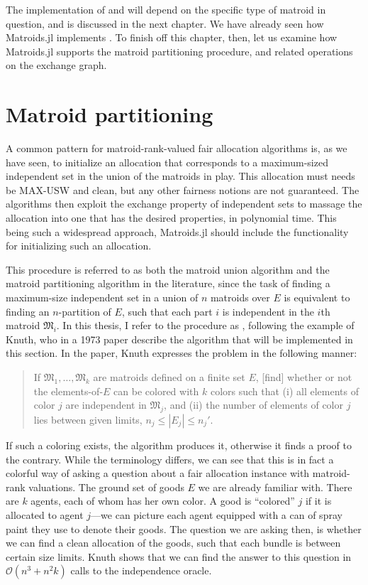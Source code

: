 The implementation of  and  will depend on the specific type of matroid in question, and is discussed in the next chapter. We have already seen how Matroids.jl implements . To finish off this chapter, then, let us examine how Matroids.jl supports the matroid partitioning procedure, and related operations on the exchange graph.

\section{Matroid partitioning}
\label{sec:matroid-union-impl}
A common pattern for matroid-rank-valued fair allocation algorithms is, as we have seen, to initialize an allocation that corresponds to a maximum-sized independent set in the union of the matroids in play. This allocation must needs be MAX-USW and clean, but any other fairness notions are not guaranteed. The algorithms then exploit the exchange property of independent sets to massage the allocation into one that has the desired properties, in polynomial time. This being such a widespread approach, Matroids.jl should include the functionality for initializing such an allocation. 

This procedure is referred to as both the matroid union algorithm and the matroid partitioning algorithm in the literature, since the task of finding a maximum-size independent set in a union of $n$ matroids over $E$ is equivalent to finding an $n$-partition of $E$, such that each part $i$ is independent in the $i$th matroid $\mathfrak{M}_i$. In this thesis, I refer to the procedure as , following the example of Knuth, who in a 1973 paper describe the algorithm that will be implemented in this section. In the paper, Knuth expresses the problem in the following manner: 
\begin{quote}
  If $\mathfrak{M}_1,\dots,\mathfrak{M}_k$ are matroids defined on a finite set $E$, [find] whether or not the elements-of-$E$ can be colored with $k$ colors such that (i) all elements of color $j$ are independent in $\mathfrak{M}_j$, and (ii) the number of elements of color $j$ lies between given limits, $n_j\leq |E_j| \leq n_j'$.~\cite{knuth1973matroidpartitioning}
\end{quote}
If such a coloring exists, the algorithm produces it, otherwise it finds a proof to the contrary. While the terminology differs, we can see that this is in fact a colorful way of asking a question about a fair allocation instance with matroid-rank valuations. The ground set of goods $E$ we are already familiar with. There are $k$ agents, each of whom has her own color. A good is ``colored'' $j$ if it is allocated to agent $j$---we can picture each agent equipped with a can of spray paint they use to denote their goods. The question we are asking then, is whether we can find a clean allocation of the goods, such that each bundle is between certain size limits. Knuth shows that we can find the answer to this question in $\mathcal{O}(n^3 + n^2k)$ calls to the independence oracle.

